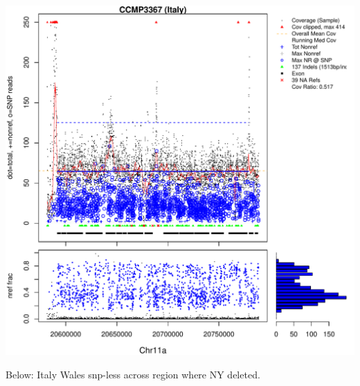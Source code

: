 \documentclass{article}\usepackage[]{graphicx}\usepackage[]{color}
\makeatletter
\def\maxwidth{ %
  \ifdim\Gin@nat@width>\linewidth
    \linewidth
  \else
    \Gin@nat@width
  \fi
}
\newenvironment{knitrout}{}{} %
\makeatother
\begin{document}
\begin{knitrout}
{\includegraphics[width=\maxwidth]{figs-knitr/unnamed-chunk-50-7} 

}



\end{knitrout}

Below: Italy Wales snp-less across region where NY deleted.
\end{document}
